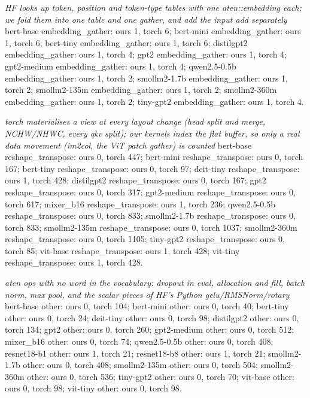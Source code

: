 \begin{minipage}{\linewidth}
\par\smallskip
\emph{HF looks up token, position and token-type tables with one aten::embedding each; we fold them into one table and one gather, and add the input add separately} bert-base embedding\_gather: ours 1, torch 6; bert-mini embedding\_gather: ours 1, torch 6; bert-tiny embedding\_gather: ours 1, torch 6; distilgpt2 embedding\_gather: ours 1, torch 4; gpt2 embedding\_gather: ours 1, torch 4; gpt2-medium embedding\_gather: ours 1, torch 4; qwen2.5-0.5b embedding\_gather: ours 1, torch 2; smollm2-1.7b embedding\_gather: ours 1, torch 2; smollm2-135m embedding\_gather: ours 1, torch 2; smollm2-360m embedding\_gather: ours 1, torch 2; tiny-gpt2 embedding\_gather: ours 1, torch 4.
\par\smallskip
\emph{torch materialises a view at every layout change (head split and merge, NCHW/NHWC, every qkv split); our kernels index the flat buffer, so only a real data movement (im2col, the ViT patch gather) is counted} bert-base reshape\_transpose: ours 0, torch 447; bert-mini reshape\_transpose: ours 0, torch 167; bert-tiny reshape\_transpose: ours 0, torch 97; deit-tiny reshape\_transpose: ours 1, torch 428; distilgpt2 reshape\_transpose: ours 0, torch 167; gpt2 reshape\_transpose: ours 0, torch 317; gpt2-medium reshape\_transpose: ours 0, torch 617; mixer\_b16 reshape\_transpose: ours 1, torch 236; qwen2.5-0.5b reshape\_transpose: ours 0, torch 833; smollm2-1.7b reshape\_transpose: ours 0, torch 833; smollm2-135m reshape\_transpose: ours 0, torch 1037; smollm2-360m reshape\_transpose: ours 0, torch 1105; tiny-gpt2 reshape\_transpose: ours 0, torch 85; vit-base reshape\_transpose: ours 1, torch 428; vit-tiny reshape\_transpose: ours 1, torch 428.
\par\smallskip
\emph{aten ops with no word in the vocabulary: dropout in eval, allocation and fill, batch norm, max pool, and the scalar pieces of HF's Python gelu/RMSNorm/rotary} bert-base other: ours 0, torch 104; bert-mini other: ours 0, torch 40; bert-tiny other: ours 0, torch 24; deit-tiny other: ours 0, torch 98; distilgpt2 other: ours 0, torch 134; gpt2 other: ours 0, torch 260; gpt2-medium other: ours 0, torch 512; mixer\_b16 other: ours 0, torch 74; qwen2.5-0.5b other: ours 0, torch 408; resnet18-b1 other: ours 1, torch 21; resnet18-b8 other: ours 1, torch 21; smollm2-1.7b other: ours 0, torch 408; smollm2-135m other: ours 0, torch 504; smollm2-360m other: ours 0, torch 536; tiny-gpt2 other: ours 0, torch 70; vit-base other: ours 0, torch 98; vit-tiny other: ours 0, torch 98.
\par\smallskip

\end{minipage}

